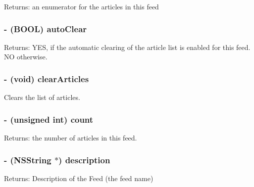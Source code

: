 \begin{Desc}
\item[Returns:]an enumerator for the articles in this feed \end{Desc}
\subsubsection{\setlength{\rightskip}{0pt plus 5cm}- (BOOL) auto\-Clear }\label{classRSSFeed_30139f9edd798429ef3cef520167a651}


\begin{Desc}
\item[Returns:]YES, if the automatic clearing of the article list is enabled for this feed. NO otherwise. \end{Desc}
\subsubsection{\setlength{\rightskip}{0pt plus 5cm}- (void) clear\-Articles }\label{classRSSFeed_add6f191f06065bbbc7d96601cf20c8f}


Clears the list of articles. 
\subsubsection{\setlength{\rightskip}{0pt plus 5cm}- (unsigned int) count }\label{classRSSFeed_fe1812219c87bda10c4ae3b2833732eb}


\begin{Desc}
\item[Returns:]the number of articles in this feed. \end{Desc}
\subsubsection{\setlength{\rightskip}{0pt plus 5cm}- (NSString $\ast$) description }\label{classRSSFeed_599797aee83058da556e71125ffde55d}


\begin{Desc}
\item[Returns:]Description of the Feed (the feed name) \end{Desc}
